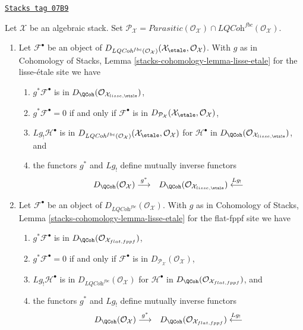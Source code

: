 \begin{lemma}
\label{stacks-perfect-lemma-derived-quasi-coherent}
\href{https://stacks.math.columbia.edu/tag/07B9}{\texttt{Stacks tag 07B9}}

Let $\mathcal{X}$ be an algebraic stack. Set
$\mathcal{P}_\mathcal{X} = \textit{Parasitic}(\mathcal{O}_\mathcal{X}) \cap
\textit{LQCoh}^{fbc}(\mathcal{O}_\mathcal{X})$.
\begin{enumerate}
\item
Let $\mathcal{F}^\bullet$ be an object of
$D_{\textit{LQCoh}^{fbc}(\mathcal{O}_\mathcal{X})}
(\mathcal{X}_\etale, \mathcal{O}_\mathcal{X})$.
With $g$ as in
Cohomology of Stacks,
Lemma \ref{stacks-cohomology-lemma-lisse-etale}
for the lisse-\'etale site we have
\begin{enumerate}
\item $g^*\mathcal{F}^\bullet$ is in
$D_\QCoh(\mathcal{O}_{\mathcal{X}_{lisse,\etale}})$,
\item $g^*\mathcal{F}^\bullet = 0$ if and only if
$\mathcal{F}^\bullet$ is in
$D_{\mathcal{P}_\mathcal{X}}(\mathcal{X}_\etale, \mathcal{O}_\mathcal{X})$,
\item $Lg_!\mathcal{H}^\bullet$ is in
$D_{\textit{LQCoh}^{fbc}(\mathcal{O}_\mathcal{X})}(
\mathcal{X}_\etale, \mathcal{O}_\mathcal{X})$
for $\mathcal{H}^\bullet$ in
$D_\QCoh(\mathcal{O}_{\mathcal{X}_{lisse,\etale}})$, and
\item the functors $g^*$ and $Lg_!$ define mutually inverse functors
$$
\begin{array}{cc}D_\QCoh(\mathcal{O}_\mathcal{X}) \overset{g^*}{\longrightarrow} & D_\QCoh(\mathcal{O}_{\mathcal{X}_{lisse,\etale}})
\overset{Lg_!}{\longleftarrow}\end{array}
$$
\end{enumerate}
\item
Let $\mathcal{F}^\bullet$ be an object of
$D_{\textit{LQCoh}^{fbc}}(\mathcal{O}_\mathcal{X})$. With $g$ as in
Cohomology of Stacks,
Lemma \ref{stacks-cohomology-lemma-lisse-etale}
for the flat-fppf site we have
\begin{enumerate}
\item $g^*\mathcal{F}^\bullet$ is in
$D_\QCoh(\mathcal{O}_{\mathcal{X}_{flat, fppf}})$,
\item $g^*\mathcal{F}^\bullet = 0$ if and only if
$\mathcal{F}^\bullet$ is in
$D_{\mathcal{P}_\mathcal{X}}(\mathcal{O}_\mathcal{X})$,
\item $Lg_!\mathcal{H}^\bullet$ is in
$D_{\textit{LQCoh}^{fbc}}(\mathcal{O}_\mathcal{X})$
for $\mathcal{H}^\bullet$ in
$D_\QCoh(\mathcal{O}_{\mathcal{X}_{flat,fppf}})$, and
\item the functors $g^*$ and $Lg_!$ define mutually inverse functors
$$
\begin{array}{cc}D_\QCoh(\mathcal{O}_\mathcal{X}) \overset{g^*}{\longrightarrow} & D_\QCoh(\mathcal{O}_{\mathcal{X}_{flat,fppf}}) \overset{Lg_!}{\longleftarrow}\end{array}
$$
\end{enumerate}
\end{enumerate}
\end{lemma}

